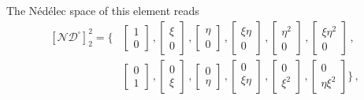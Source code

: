 The  N\'ed\'elec space of this element reads 
 \begin{equation}
 \begin{aligned}
  \left[ \mathcal{ND}^\square \right]^{2}_2 = \bigg\{ & \left[ \begin{array}{c}
1 \\
0  
  \end{array} \right] \,, \left[ \begin{array}{c}
\xi \\
0
  \end{array} \right]  \,, \left[ \begin{array}{c}
\eta \\
0
  \end{array} \right]  \,, \left[ \begin{array}{c}
\xi \eta \\
0
  \end{array} \right]  \,,  \left[ \begin{array}{c}
\eta^2 \\
0
  \end{array} \right]  \,,    \left[ \begin{array}{c}
\xi \eta^2 \\
0
  \end{array} \right]  \,,  \\ & \left[ \begin{array}{c} 
0 \\
1 
  \end{array} \right] \,, \left[ \begin{array}{c}
0 \\
\xi
  \end{array} \right]  \,, \left[ \begin{array}{c}
0 \\
\eta
  \end{array} \right]  \,, \left[ \begin{array}{c}
0 \\ 
\xi \eta \\
  \end{array} \right]  \,,  \left[ \begin{array}{c}
0 \\
\xi^2
  \end{array} \right]  \,,  \left[ \begin{array}{c}
0 \\
\eta \xi^2
  \end{array} \right] \bigg\}  \,,
   \end{aligned}
 \end{equation}
